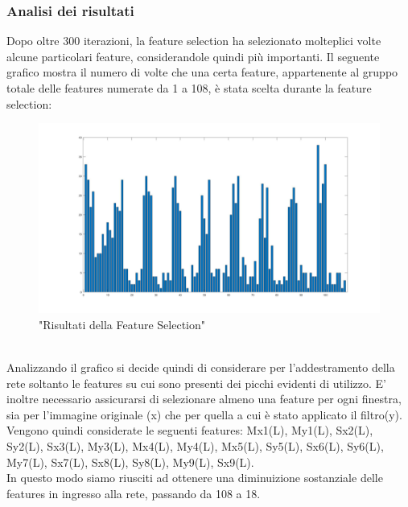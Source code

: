 \documentclass[a4paper,11pt]{article}
\begin{document}
    \subsubsection{Analisi dei risultati}
    Dopo oltre 300 iterazioni, la feature selection ha selezionato molteplici volte alcune particolari feature, considerandole quindi più importanti.
    Il seguente grafico mostra il numero di volte che una certa feature, appartenente al gruppo totale delle features numerate da 1 a 108, è stata scelta durante la feature selection: 
    \begin{figure}[h]
        \centering
        \includegraphics[scale=0.18]{featureselection}
        \caption{"Risultati della Feature Selection"}
    \end{figure}
    \\Analizzando il grafico si decide quindi di considerare per l'addestramento della rete soltanto le features su cui sono presenti dei picchi evidenti di utilizzo. E' inoltre necessario assicurarsi di selezionare
    almeno una feature per ogni finestra, sia per l'immagine originale (x) che per quella a cui è stato applicato il filtro(y). Vengono quindi considerate le seguenti features:
    Mx1(L), My1(L), Sx2(L), Sy2(L), Sx3(L), My3(L), Mx4(L), My4(L), Mx5(L), Sy5(L), Sx6(L), Sy6(L), My7(L), Sx7(L), Sx8(L), Sy8(L), My9(L), Sx9(L).\\
    In questo modo siamo riusciti ad ottenere una diminuizione sostanziale delle features in ingresso alla rete, passando da 108 a 18.
    \newpage
\end{document}
